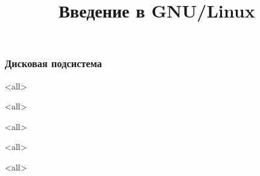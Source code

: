 

\title{Введение в GNU/Linux}








\begin{frame}
	\frametitle{Дисковая подсистема}
	\titlepage
	\vspace{-0.5cm}
	\begin{center}
	\end{center}
\end{frame}
\begin{frame}
	\tableofcontents
\end{frame}


\mode<all>{}

\mode<all>{}

\mode<all>{}

\mode<all>{}

\mode<all>{}


